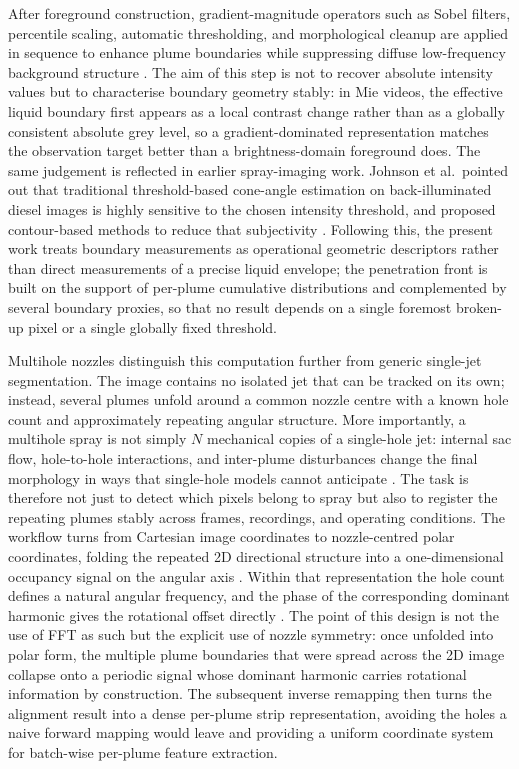 \documentclass[english, 12pt, a4paper, elec, utf8, a-2b, online]{aaltothesis}
\begin{document}
After foreground construction, gradient-magnitude operators such as Sobel filters, percentile scaling, automatic thresholding,
and morphological cleanup are applied in sequence to enhance plume boundaries while suppressing diffuse low-frequency background structure
\cite{GonzalezWoodsDIP,Szeliski2010Vision,ZackRogersLatt1977}.
The aim of this step is not to recover absolute intensity values but to characterise boundary geometry stably:
in Mie videos, the effective liquid boundary first appears as a local contrast change rather than as a globally consistent absolute grey level,
so a gradient-dominated representation matches the observation target better than a brightness-domain foreground does.
The same judgement is reflected in earlier spray-imaging work.
Johnson et al.\ pointed out that traditional threshold-based cone-angle estimation on back-illuminated diesel images
is highly sensitive to the chosen intensity threshold, and proposed contour-based methods to reduce that subjectivity
\cite{JohnsonNaberLee2012}.
Following this, the present work treats boundary measurements as operational geometric descriptors rather than direct measurements of a precise liquid envelope;
the penetration front is built on the support of per-plume cumulative distributions and complemented by several boundary proxies,
so that no result depends on a single foremost broken-up pixel or a single globally fixed threshold.

Multihole nozzles distinguish this computation further from generic single-jet segmentation.
The image contains no isolated jet that can be tracked on its own;
instead, several plumes unfold around a common nozzle centre with a known hole count and approximately repeating angular structure.
More importantly, a multihole spray is not simply \(N\) mechanical copies of a single-hole jet:
internal sac flow, hole-to-hole interactions, and inter-plume disturbances change the final morphology in ways that single-hole models cannot anticipate
\cite{JinKimKakamiNishidaOgataLuo2020,MopuriGrahnSedarskyHyvonen2024}.
The task is therefore not just to detect which pixels belong to spray but also to register the repeating plumes stably across frames, recordings, and operating conditions.
The workflow turns from Cartesian image coordinates to nozzle-centred polar coordinates,
folding the repeated 2D directional structure into a one-dimensional occupancy signal on the angular axis \cite{Szeliski2010Vision}.
Within that representation the hole count defines a natural angular frequency,
and the phase of the corresponding dominant harmonic gives the rotational offset directly \cite{CooleyTukey1965FFT}.
The point of this design is not the use of FFT as such but the explicit use of nozzle symmetry:
once unfolded into polar form, the multiple plume boundaries that were spread across the 2D image collapse onto a periodic signal
whose dominant harmonic carries rotational information by construction.
The subsequent inverse remapping then turns the alignment result into a dense per-plume strip representation,
avoiding the holes a naive forward mapping would leave and providing a uniform coordinate system for batch-wise per-plume feature extraction.
\end{document}
